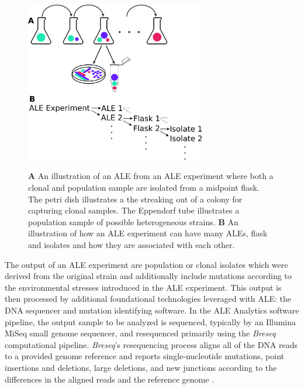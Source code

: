\documentclass[12pt,final,masters,chapterheads]{ucsd}  %
\begin{document}
\begin{figure}[h!]
  \caption{\textbf{A} An illustration of an ALE from an ALE experiment where both a clonal and population sample are isolated from a midpoint flask. The petri dish illustrates a the streaking out of a colony for capturing clonal samples. The Eppendorf tube illustrates a population sample of possible heterogeneous strains. \textbf{B} An illustration of how an ALE experiment can have many ALEs, flask and isolates and how they are associated with each other.}
  \centering
  \includegraphics[width=0.7\textwidth]{ale_experiment_samples.png}
  \label{fig:ale_experiment_samples}
\end{figure}

%
%

The output of an ALE experiment are population or clonal isolates which were derived from the original strain and additionally include mutations according to the environmental stresses introduced in the ALE experiment. This output is then processed by additional foundational technologies leveraged with ALE: the DNA sequencer and mutation identifying software. In the ALE Analytics software pipeline, the output sample to be analyzed is sequenced, typically by an Illumina MiSeq small genome sequencer, and resequenced primarily using the \textit{Breseq} computational pipeline. \textit{Breseq}'s resequencing process aligns all of the DNA reads to a provided genome reference and reports single-nucleotide mutations, point insertions and deletions, large deletions, and new junctions according to the differences in the aligned reads and the reference genome \cite{breseq_paper}.
\end{document}
